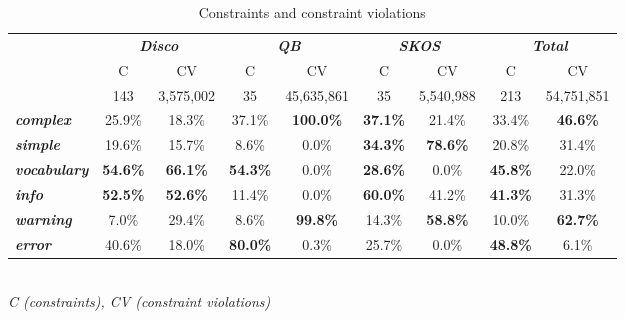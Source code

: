 \documentclass{llncs}
\begin{document}
\begin{table}[H]
		\scriptsize
    \begin{center}
    \begin{tabular}{@{}lcccccccc@{}}
		\hline
    \multirow{2}{*}{} &
      \multicolumn{2}{c}{\textbf{\emph{Disco}}} &
      \multicolumn{2}{c}{\textbf{\emph{QB}}} &
      \multicolumn{2}{c}{\textbf{\emph{SKOS}}} &
      \multicolumn{2}{c}{\textbf{\emph{Total}}} \\
    \textbf{} & C & CV & C & CV & C & CV & C & CV \\
    \hline
		 & 143 & 3,575,002 & 35 & 45,635,861 & 35 & 5,540,988 & 213 & 54,751,851 \\
		\hline
		\textbf{\emph{complex}} & 25.9\% & 18.3\% & 37.1\% & \textbf{100.0\%} & \textbf{37.1\%} & 21.4\% & 33.4\% & \textbf{46.6\%} \\
		\textbf{\emph{simple}} & 19.6\% & 15.7\% & 8.6\% & 0.0\% & \textbf{34.3\%} & \textbf{78.6\%} & 20.8\% & 31.4\% \\
		\textbf{\emph{vocabulary}} & \textbf{54.6\%} & \textbf{66.1\%} & \textbf{54.3\%} & 0.0\% & \textbf{28.6\%} & 0.0\% & \textbf{45.8\%} & 22.0\% \\
		\hline
		\textbf{\emph{info}} & \textbf{52.5\%} & \textbf{52.6\%} & 11.4\% & 0.0\% & \textbf{60.0\%} & 41.2\% & \textbf{41.3\%} & 31.3\% \\
		\textbf{\emph{warning}} & 7.0\% & 29.4\% & 8.6\% & \textbf{99.8\%} & 14.3\% & \textbf{58.8\%} & 10.0\% & \textbf{62.7\%} \\
		\textbf{\emph{error}} & 40.6\% & 18.0\% & \textbf{80.0\%} & 0.3\% & 25.7\% & 0.0\% & \textbf{48.8\%} & 6.1\%\\
    \bottomrule
    \end{tabular}
    \\ \emph{C (constraints), CV (constraint violations)}
    \caption{Constraints and constraint violations}
		\label{tab:evaluation-constraint-violations}
    \end{center}
\end{table}
\end{document}
